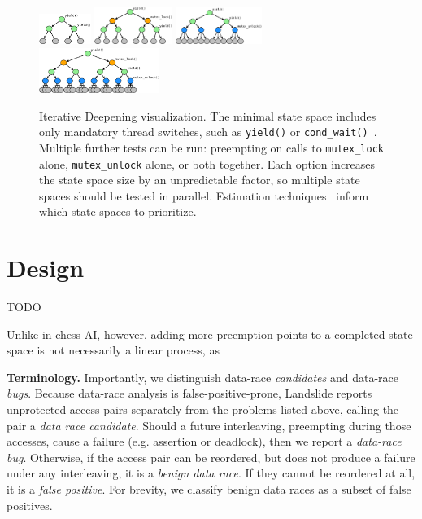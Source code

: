 \begin{figure}[t]
	\includegraphics[width=0.15\textwidth]{tree0.pdf}
	\includegraphics[width=0.225\textwidth]{tree1.pdf}
	\includegraphics[width=0.25\textwidth]{tree2.pdf}
	\includegraphics[width=0.35\textwidth]{tree3.pdf}
	\caption{Iterative Deepening visualization.
		The minimal state space includes only mandatory thread switches, such as {\tt yield()} or {\tt cond\_wait()}~\cite{landslide}.
Multiple further tests can be run: preempting on calls to {\tt mutex\_lock} alone, {\tt mutex\_unlock} alone, or both together.
Each option increases the state space size by an unpredictable factor, so multiple state spaces should be tested in parallel.
Estimation techniques~\cite{estimation} inform which state spaces to prioritize.
}
	\label{fig:id}
\end{figure}
\section{Design}

TODO

Unlike in chess AI, however, adding more preemption points to a completed state space is not necessarily a linear process, as  %


{\bf Terminology.}
Importantly, we distinguish data-race {\em candidates} and data-race {\em bugs}.
Because data-race analysis is false-positive-prone, Landslide reports unprotected access pairs separately from the problems listed above, calling the pair a {\em data race candidate}.
Should a future interleaving, preempting during those accesses, cause a failure (e.g. assertion or deadlock), then we report a {\em data-race bug}.
Otherwise, if the access pair can be reordered, but does not produce a failure under any interleaving, it is a {\em benign data race}.
If they cannot be reordered at all, it is a {\em false positive}.
For brevity, we classify benign data races as a subset of false positives.

